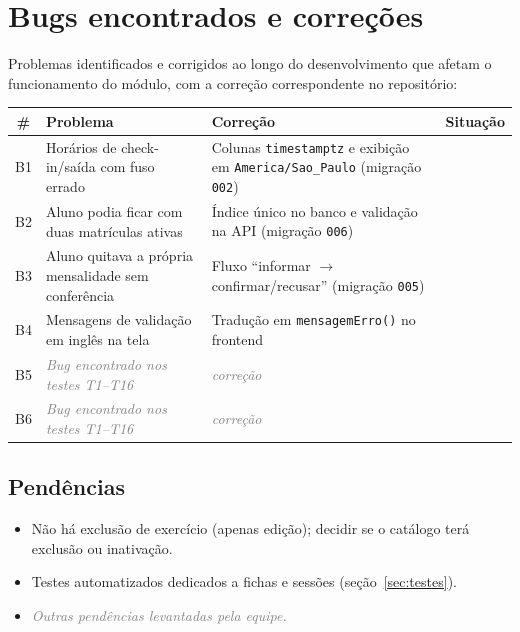 \documentclass[11pt,a4paper,final]{article}
\newcommand{\ok}{\textcolor{verde}{\ding{51}}}
\newcommand{\cod}[1]{\texttt{#1}}
\newcommand{\preencher}[1]{\textit{\textcolor{gray}{#1}}}
\begin{document}
\section{Bugs encontrados e correções}\label{sec:bugs}

Problemas identificados e corrigidos ao longo do desenvolvimento que afetam o funcionamento do módulo, com a
correção correspondente no repositório:

\begin{xltabular}{\textwidth}{c Y Y c}
  \toprule
  \textbf{\#} & \textbf{Problema} & \textbf{Correção} & \textbf{Situação} \\
  \midrule
  \endhead
  B1 & Horários de check-in/saída com fuso errado & Colunas \cod{timestamptz} e exibição em \cod{America/Sao\_Paulo} (migração \cod{002}) & \ok \\
  B2 & Aluno podia ficar com duas matrículas ativas & Índice único no banco e validação na API (migração \cod{006}) & \ok \\
  B3 & Aluno quitava a própria mensalidade sem conferência & Fluxo ``informar $\rightarrow$ confirmar/recusar'' (migração \cod{005}) & \ok \\
  B4 & Mensagens de validação em inglês na tela & Tradução em \cod{mensagemErro()} no frontend & \ok \\
  B5 & \preencher{Bug encontrado nos testes T1--T16} & \preencher{correção} & \preencher{} \\
  B6 & \preencher{Bug encontrado nos testes T1--T16} & \preencher{correção} & \preencher{} \\
  \bottomrule
\end{xltabular}

\subsection{Pendências}

\begin{itemize}
  \item Não há exclusão de exercício (apenas edição); decidir se o catálogo terá exclusão ou inativação.
  \item Testes automatizados dedicados a fichas e sessões (seção~\ref{sec:testes}).
  \item \preencher{Outras pendências levantadas pela equipe.}
\end{itemize}

\end{document}
